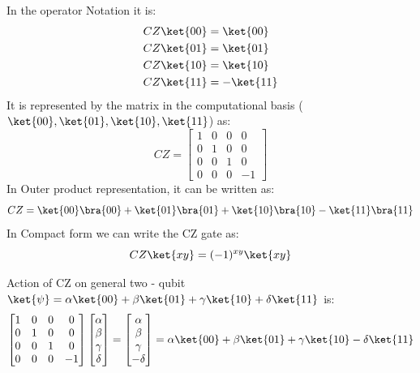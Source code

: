\documentclass[12pt, oneside]{book}
\theoremstyle{definition}
\theoremstyle{definition}
\theoremstyle{remark}
\begin{document}
In the operator Notation it is:
\begin{align*}
    CZ\ket{00}&=\ket{00} \\
    CZ\ket{01}&=\ket{01} \\
    CZ\ket{10}&=\ket{10} \\
    CZ\ket{11}&=-\ket{11}
\end{align*}
It is represented by the matrix in the computational basis ($\ket{00},\ket{01},\ket{10},\ket{11}$) as:
\[
    CZ=\begin{bmatrix}
        1 & 0 & 0 & 0 \\
        0 & 1 & 0 & 0 \\
        0 & 0 & 1 & 0 \\
        0 & 0 & 0 & -1
    \end{bmatrix}
\]
In Outer product representation, it can be written as:
\[
    CZ=\ket{00}\bra{00}+\ket{01}\bra{01}+\ket{10}\bra{10}-\ket{11}\bra{11}
\]
In Compact form we can write the CZ gate as:
\[
    CZ\ket{xy}=(-1)^{xy}\ket{xy}
\]

Action of CZ on general two - qubit $\ket{\psi} = \alpha\ket{00}+\beta\ket{01}+\gamma\ket{10}+\delta\ket{11}$ is:
\[
    \begin{bmatrix} 
        1 & 0 & 0 & 0 \\
        0 & 1 & 0 & 0 \\
        0 & 0 & 1 & 0 \\
        0 & 0 & 0 & -1
    \end{bmatrix}\begin{bmatrix}
        \alpha \\
        \beta \\
        \gamma \\
        \delta
    \end{bmatrix}=\begin{bmatrix}
        \alpha \\
        \beta \\
        \gamma \\
        -\delta
    \end{bmatrix}=\alpha\ket{00}+\beta\ket{01}+\gamma\ket{10}-\delta\ket{11}
\]
\end{document}
